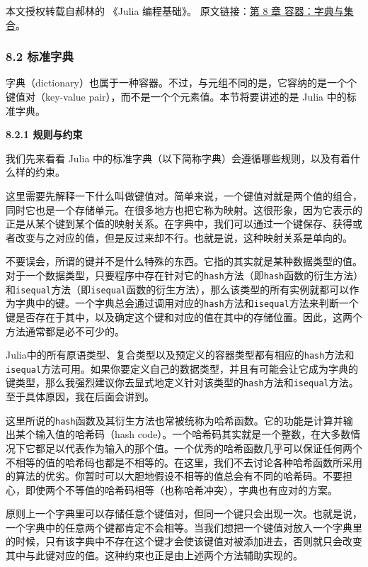 
本文授权转载自郝林的 《Julia 编程基础》。 原文链接：\href{https://github.com/hyper0x/JuliaBasics/blob/master/book/ch08.md}{第 8 章 容器：字典与集合}。


\subsubsection{8.2 标准字典}

字典（dictionary）也属于一种容器。不过，与元组不同的是，它容纳的是一个个键值对（key-value pair），而不是一个个元素值。本节将要讲述的是 Julia 中的标准字典。

\textbf{8.2.1 规则与约束}

我们先来看看 Julia 中的标准字典（以下简称字典）会遵循哪些规则，以及有着什么样的约束。

这里需要先解释一下什么叫做键值对。简单来说，一个键值对就是两个值的组合，同时它也是一个存储单元。在很多地方也把它称为映射。这很形象，因为它表示的正是从某个键到某个值的映射关系。在字典中，我们可以通过一个键保存、获得或者改变与之对应的值，但是反过来却不行。也就是说，这种映射关系是单向的。

不要误会，所谓的键并不是什么特殊的东西。它指的其实就是某种数据类型的值。对于一个数据类型，只要程序中存在针对它的\verb`hash`方法（即\verb`hash`函数的衍生方法）和\verb`isequal`方法（即\verb`isequal`函数的衍生方法），那么该类型的所有实例就都可以作为字典中的键。一个字典总会通过调用对应的\verb`hash`方法和\verb`isequal`方法来判断一个键是否存在于其中，以及确定这个键和对应的值在其中的存储位置。因此，这两个方法通常都是必不可少的。

Julia中的所有原语类型、复合类型以及预定义的容器类型都有相应的\verb`hash`方法和\verb`isequal`方法可用。如果你要定义自己的数据类型，并且有可能会让它成为字典的键类型，那么我强烈建议你去显式地定义针对该类型的\verb`hash`方法和\verb`isequal`方法。至于具体原因，我在后面会讲到。

这里所说的\verb`hash`函数及其衍生方法也常被统称为哈希函数。它的功能是计算并输出某个输入值的哈希码（hash code）。一个哈希码其实就是一个整数，在大多数情况下它都足以代表作为输入的那个值。一个优秀的哈希函数几乎可以保证任何两个不相等的值的哈希码也都是不相等的。在这里，我们不去讨论各种哈希函数所采用的算法的优劣。你暂时可以大胆地假设不相等的值总会有不同的哈希码。不要担心，即使两个不等值的哈希码相等（也称哈希冲突），字典也有应对的方案。

原则上一个字典里可以存储任意个键值对，但同一个键只会出现一次。也就是说，一个字典中的任意两个键都肯定不会相等。当我们想把一个键值对放入一个字典里的时候，只有该字典中不存在这个键才会使该键值对被添加进去，否则就只会改变其中与此键对应的值。这种约束也正是由上述两个方法辅助实现的。

